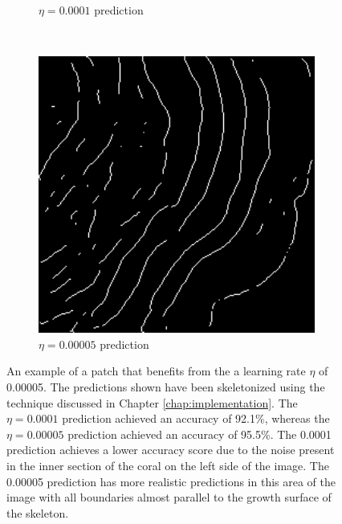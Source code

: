 \begin{figure}[!t]
\begin{subfigure}[t]{0.32\textwidth}
        \caption{$\eta=0.0001$ prediction}
    \end{subfigure}
    ~
    \begin{subfigure}[t]{0.32\textwidth}
        \centering
        \includegraphics[width=1\textwidth, valign=c]{images/5e5-example.png}
        \caption{$\eta=0.00005$ prediction}
    \end{subfigure}
    \caption{An example of a patch that benefits from the a learning rate $\eta$ of 0.00005. The predictions shown have been skeletonized using the technique discussed in Chapter \ref{chap:implementation}. The $\eta=0.0001$ prediction achieved an accuracy of 92.1\%, whereas the $\eta=0.00005$ prediction achieved an accuracy of 95.5\%. The 0.0001 prediction achieves a lower accuracy score due to the noise present in the inner section of the coral on the left side of the image. The 0.00005 prediction has more realistic predictions in this area of the image with all boundaries almost parallel to the growth surface of the skeleton.}
    \label{fig:lrdiff}
\end{figure}

